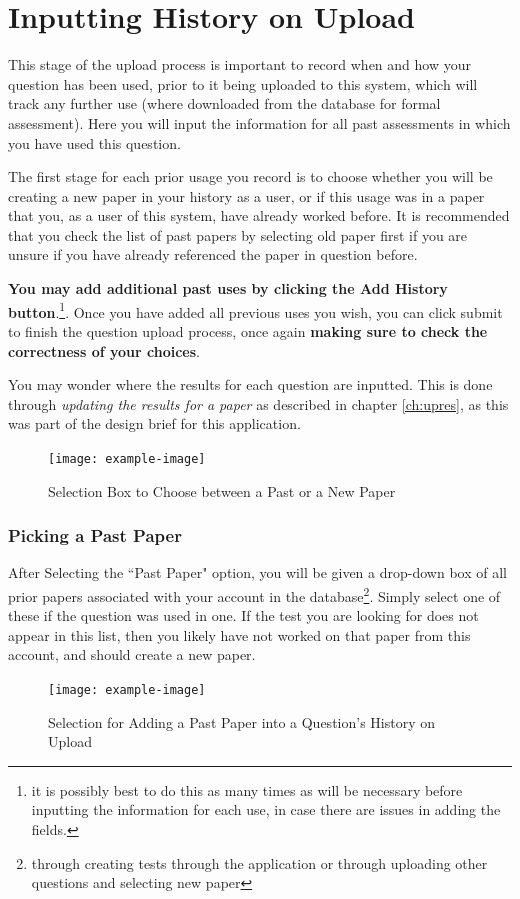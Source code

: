 \documentclass[12pt, a4paper, titlepage]{book}
\begin{document}
\section{Inputting History on Upload}
This stage of the upload process is important to record when and how your question has been used, prior to it being uploaded to this system, which will track any further use (where downloaded from the database for formal assessment). Here you will input the information for all past assessments in which you have used this question.\par
The first stage for each prior usage you record is to choose whether you will be creating a new paper  in your history as a user, or if this usage was in a paper that you, as a user of this system, have already worked before. It is recommended that you check the list of past papers by selecting old paper first if you are unsure if you have already referenced the paper in question before. \par
\textbf{You may add additional past uses by clicking the Add History button}.\footnote{it is possibly best to do this as many times as will be necessary before inputting the information for each use, in case there are issues in adding the fields.}. Once you have added all previous uses you wish, you can click submit to finish the question upload process, once again \textbf{making sure to check the correctness of your choices}.
\par You may wonder where the results for each question are inputted. This is done through \textit{updating the results for a paper} as described in chapter \ref{ch:upres}, as this was part of the design brief for this application.
\begin{figure}[htp]
\centering
\texttt{[image: example-image]}
\caption{Selection Box to Choose between a Past or a New Paper}
\end{figure}
\subsubsection{Picking a Past Paper}
After Selecting the ``Past Paper" option, you will be given a drop-down box of all prior papers associated with your account in the database\footnote{through creating tests through the application or through uploading other questions and selecting new paper}. Simply select one of these if the question was used in one. If the test you are looking for does not appear in this list, then you likely have not worked on that paper from this account, and should create a new paper.
\begin{figure}[H]
\centering
\texttt{[image: example-image]}
\caption{Selection for Adding a Past Paper into a Question's History on Upload}
\end{figure}
\end{document}
